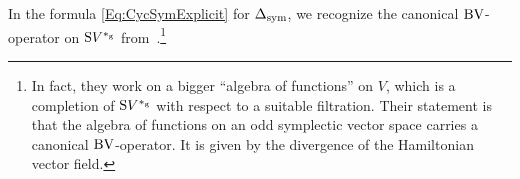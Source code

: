 \documentclass[\MainFolder/Text.tex]{subfiles}
\begin{document}
In the formula \eqref{Eq:CycSymExplicit} for $\operatorname{\Delta}_{\mathrm{sym}}$, we recognize the canonical $\mathrm{BV}$-operator on $\mathrm{S} V^{*_{\mathrm{g}}}$ from~\cite[Definition~4]{Doubek2018}.\footnote{In fact, they work on a bigger ``algebra of functions'' on $V$, which is a completion of $\mathrm{S} V^{*_{\mathrm{g}}}$ with respect to a suitable filtration. Their statement is that the algebra of functions on an odd symplectic vector space carries a canonical $\mathrm{BV}$-operator. It is given by the divergence of the Hamiltonian vector field.}
\end{document}
